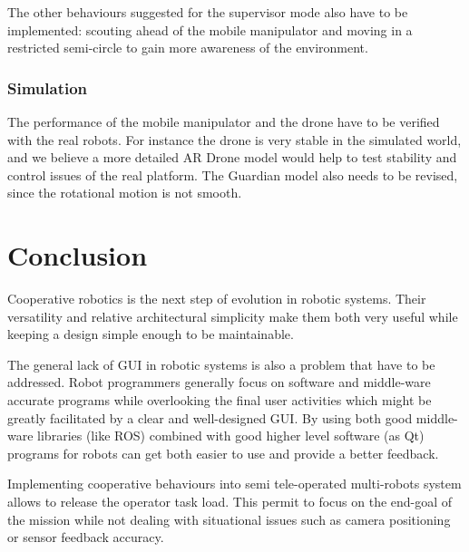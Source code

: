 \documentclass[11pt,a4paper]{article}
\begin{document}
The other behaviours suggested for the supervisor mode also have to be implemented: scouting ahead of the mobile manipulator and moving in a restricted semi-circle to gain more awareness of the environment.


\subsubsection{Simulation}
The performance of the mobile manipulator and the drone have to be verified with the real robots. For instance the drone is very stable in the simulated world, and we believe a more detailed AR Drone model would help to test stability and control issues of the real platform.
The Guardian model also needs to be revised, since the rotational motion is not smooth.


\clearpage
\section{Conclusion}
Cooperative robotics is the next step of evolution in robotic systems.
Their versatility and relative architectural simplicity make them both very useful while
keeping a design simple enough to be maintainable.

The general lack of GUI in robotic systems is also a problem that have to be addressed. 
Robot programmers generally focus on software and middle-ware accurate programs while 
overlooking the final user activities which might be greatly facilitated by a clear and 
well-designed GUI.
By using both good middle-ware libraries (like ROS) combined with good higher level
software (as Qt) programs for robots can get both easier to use and provide a better 
feedback.

Implementing cooperative behaviours into semi tele-operated multi-robots system allows to release 
the operator task load. This permit to focus on the end-goal of the mission while not dealing 
with situational issues such as camera positioning or sensor feedback accuracy.



\listoffigures
\end{document}
